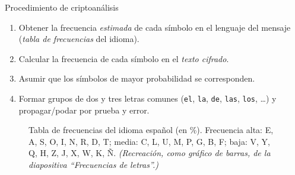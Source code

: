 \documentclass[11pt,a4paper]{article}
\begin{document}
\begin{defbox}{Procedimiento de criptoanálisis}
\begin{enumerate}[leftmargin=1.6em,itemsep=1pt]
  \item Obtener la frecuencia \emph{estimada} de cada símbolo en el lenguaje del mensaje
        (\emph{tabla de frecuencias} del idioma).
  \item Calcular la frecuencia de cada símbolo en el \emph{texto cifrado}.
  \item Asumir que los símbolos de mayor probabilidad se corresponden.
  \item Formar grupos de dos y tres letras comunes (\texttt{el}, \texttt{la}, \texttt{de},
        \texttt{las}, \texttt{los}, \dots) y propagar/podar por prueba y error.
\end{enumerate}
\end{defbox}

\begin{figure}[h]
\centering
{}
\caption{Tabla de frecuencias del idioma español (en \%). Frecuencia alta: E, A, S, O, I, N,
R, D, T; media: C, L, U, M, P, G, B, F; baja: V, Y, Q, H, Z, J, X, W, K, Ñ.
\textit{(Recreación, como gráfico de barras, de la diapositiva ``Frecuencias de letras''.)}}
\end{figure}
\end{document}
